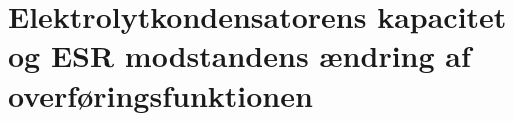 \section{Elektrolytkondensatorens kapacitet og ESR modstandens ændring af overføringsfunktionen}\label{sec:spm4}